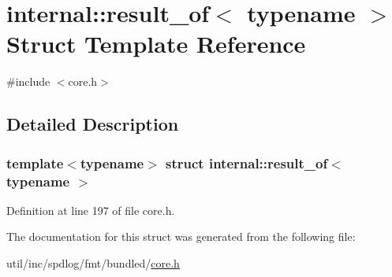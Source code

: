 \hypertarget{structinternal_1_1result__of}{}\section{internal\+:\+:result\+\_\+of$<$ typename $>$ Struct Template Reference}
\label{structinternal_1_1result__of}


{\ttfamily \#include $<$core.\+h$>$}



\subsection{Detailed Description}
\subsubsection*{template$<$typename$>$\newline
struct internal\+::result\+\_\+of$<$ typename $>$}



Definition at line 197 of file core.\+h.



The documentation for this struct was generated from the following file\+:\begin{DoxyCompactItemize}
\item 
util/inc/spdlog/fmt/bundled/\hyperlink{core_8h}{core.\+h}\end{DoxyCompactItemize}

